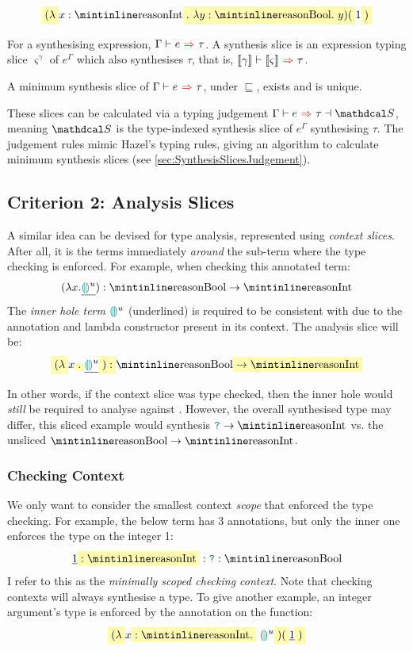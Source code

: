 \[\hlcmaths[yellow!30]{(\lambda} x: \code{Int}\hlcmaths[yellow!30]{.\ \lambda y : \code{Bool}.\ y)(}1\hlcmaths[yellow!30]{)}\]

\begin{definition}
For a synthesising expression, $\synthesis{e}{\tau}$. A synthesis slice is an expression typing slice $\varsigma^{\gamma}$ of $e^\Gamma$ which also synthesises $\tau$, that is, $\synthesis[\type{\gamma}]{\type{\varsigma}}{\tau}$.
\end{definition}
\begin{proposition}
A minimum synthesis slice of $\synthesis{e}{\tau}$, under $\sqsubseteq$, exists and is unique.
\end{proposition}

These slices can be calculated via a typing judgement $\synthesisslice{e}{\tau}{\S}$, meaning $\S$ is the type-indexed synthesis slice of $e^\Gamma$ synthesising $\tau$. The judgement rules mimic Hazel's typing rules, giving an algorithm to calculate minimum synthesis slices (see \cref{sec:SynthesisSlicesJudgement}).

\subsection{Criterion 2: Analysis Slices}\label{sec:AnalysisSlices}
A similar idea can be devised for type analysis, represented using \textit{context slices}. After all, it is the terms immediately \textit{around} the sub-term where the type checking is enforced. For example, when checking this annotated term:
\[(\lambda x. \underline{\hole^u}) : \code{Bool} \to \code{Int}\]
The \textit{inner hole term} ${\color{teal}\llparenthesis}  {\color{teal}\rrparenthesis}^u$ (underlined) is required to be consistent with  due to the annotation and lambda constructor present in its context. The analysis slice will be:
\[\hlcmaths[yellow!30]{(\lambda} x\hlcmaths[yellow!30]{.} \underline{\hole^u} \hlcmaths[yellow!30]{) : } \code{Bool} \hlcmaths[yellow!30]{\to \code{Int}}\]

In other words, if the context slice was type checked, then the inner hole would \textit{still} be required to analyse against . However, the overall synthesised type may differ, this sliced example would synthesis $\dyn \to \code{Int}$ vs. the unsliced $\code{Bool} \to \code{Int}$.


\subsubsection{Checking Context}
\label{sec:CheckingContexts}
We only want to consider the smallest context \textit{scope} that enforced the type checking. For example, the below term has 3 annotations, but only the inner one enforces the  type on the integer 1:
\[\underline{1} \hlcmaths[yellow!30]{: \code{Int}} : \dyn : \code{Bool}\]
I refer to this as the \textit{minimally scoped checking context}. Note that checking contexts will always synthesise a type. To give another example, an integer argument's type is enforced by the annotation on the function:
\[\hlcmaths[yellow!30]{(\lambda} x \hlcmaths[yellow!30]{: \code{Int}.}\ \hole^u\hlcmaths[yellow!30]{)(}\underline{1}\hlcmaths[yellow!30]{)}\]


